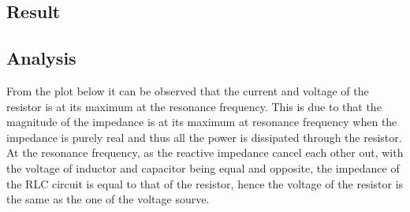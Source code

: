 \documentclass{article}
\begin{document}
\subsection*{Result}
\begin{table}[H]
\end{table}


\subsection*{Analysis}
From the plot below it can be observed that the current and voltage of the resistor is at its maximum at the resonance frequency. This is due to that the magnitude of the impedance is at its maximum at resonance frequency when the impedance is purely real and thus all the power is dissipated through the resistor. At the resonance frequency, as the reactive impedance cancel each other out, with the voltage of inductor and capacitor being equal and opposite, the impedance of the RLC circuit is equal to that of the resistor, hence the voltage of the resistor is the same as the one of the voltage sourve.
\end{document}
